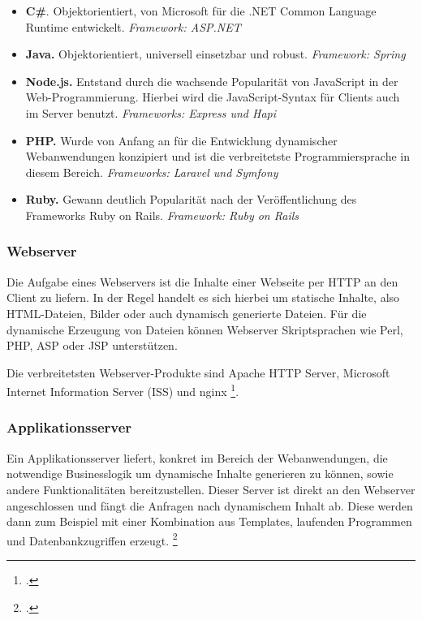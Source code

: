 \begin{itemize}
	\item \textbf{C\#}. Objektorientiert, von Microsoft für die .NET Common Language Runtime entwickelt. \textit{Framework: ASP.NET}
	\item \textbf{Java.} Objektorientiert, universell einsetzbar und robust. \textit{Framework: Spring}
	\item \textbf{Node.js.} Entstand durch die wachsende Popularität von JavaScript in der Web-Programmierung. Hierbei wird die JavaScript-Syntax für Clients auch im Server benutzt. \textit{Frameworks: Express und Hapi}
	\item \textbf{PHP.} Wurde von Anfang an für die Entwicklung dynamischer Webanwendungen konzipiert und ist die verbreitetste Programmiersprache in diesem Bereich. \textit{Frameworks: Laravel und Symfony}
	\item \textbf{Ruby.} Gewann deutlich Popularität nach der Veröffentlichung des Frameworks Ruby on Rails. \textit{Framework: Ruby on Rails}
\end{itemize}

\subsubsection{Webserver}
Die Aufgabe eines Webservers ist die Inhalte einer Webseite per \acs{HTTP} an den Client zu liefern. In der Regel handelt es sich hierbei um statische Inhalte, also \acs{HTML}-Dateien, Bilder oder auch dynamisch generierte Dateien. Für die dynamische Erzeugung von Dateien können Webserver Skriptsprachen wie Perl, PHP, ASP oder JSP unterstützen.

Die verbreitetsten Webserver-Produkte sind Apache \acs{HTTP} Server, Microsoft Internet Information Server (\acs{ISS}) und nginx \footcite[Vgl.][]{Rouse2012}.

\subsubsection{Applikationsserver}
Ein Applikationsserver liefert, konkret im Bereich der Webanwendungen, die notwendige Businesslogik um dynamische Inhalte generieren zu können, sowie andere Funktionalitäten bereitzustellen. Dieser Server ist direkt an den Webserver angeschlossen und fängt die Anfragen nach dynamischem Inhalt ab. Diese werden dann zum Beispiel mit einer Kombination aus Templates, laufenden Programmen und Datenbankzugriffen erzeugt. \footcite[Vgl.][]{ITWissen.info2013}

